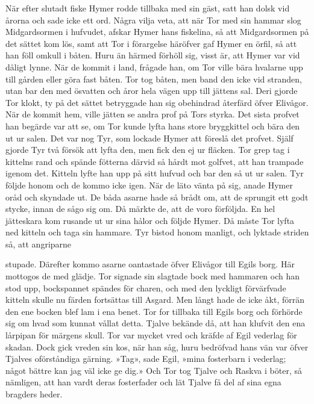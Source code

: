 När efter slutadt fiske Hymer rodde tillbaka med sin gäst, satt han
dolsk vid årorna och sade icke ett ord. Några vilja veta, att när Tor
med sin hammar slog Midgardsormen i hufvudet, afskar Hymer hans
fiskelina, så att Midgardsormen på det sättet kom lös, samt att Tor i
förargelse häröfver gaf Hymer en örfil, så att han föll omkull i båten.
Huru än härmed förhöll sig, visst är, att Hymer var vid dåligt lynne.
När de kommit i land, frågade han, om Tor ville bära hvalarne upp till
gården eller göra fast båten. Tor tog båten, men band den icke vid
stranden, utan bar den med ösvatten och åror hela vägen upp till jättens
sal. Deri gjorde Tor klokt, ty på det sättet betryggade han sig
obehindrad återfärd öfver Elivågor. När de kommit hem, ville jätten se
andra prof på Tors styrka. Det sista profvet han begärde var att se, om
Tor kunde lyfta hans store bryggkittel och bära den ut ur salen. Det var
nog Tyr, som lockade Hymer att föreslå det profvet. Själf gjorde Tyr två
försök att lyfta den, men fick den ej ur fläcken. Tor grep tag i
kittelns rand och spände fötterna därvid så hårdt mot golfvet, att han
trampade igenom det. Kitteln lyfte han upp på sitt hufvud och bar den så
ut ur salen. Tyr följde honom och de kommo icke igen. När de läto vänta
på sig, anade Hymer oråd och skyndade ut. De båda asarne hade så brådt
om, att de sprungit ett godt stycke, innan de sågo sig om. Då märkte de,
att de voro förföljda. En hel jätteskara kom rusande ut ur sina hålor
och följde Hymer. Då måste Tor lyfta ned kitteln och taga sin hammare.
Tyr bistod honom manligt, och lyktade striden så, att angriparne

stupade. Därefter kommo asarne oantastade öfver Elivågor till Egils
borg. Här mottogos de med glädje. Tor signade sin slagtade bock med
hammaren och han stod upp, bockspannet spändes för charen, och med den
lyckligt förvärfvade kitteln skulle nu färden fortsättas till Asgard.
Men långt hade de icke åkt, förrän den ene bocken blef lam i ena benet.
Tor for tillbaka till Egils borg och förhörde sig om hvad som kunnat
vållat detta. Tjalve bekände då, att han klufvit den ena lårpipan för
märgens skull. Tor var mycket vred och kräfde af Egil vederlag för
skadan. Dock gick vreden sin kos, när han såg, huru bedröfvad hans vän
var öfver Tjalves oförståndiga gärning. »Tag», sade Egil, »mina
fosterbarn i vederlag; något bättre kan jag väl icke ge dig.» Och Tor
tog Tjalve och Raskva i böter, så nämligen, att han vardt deras
fosterfader och lät Tjalve få del af sina egna bragders heder.

\endSecII

